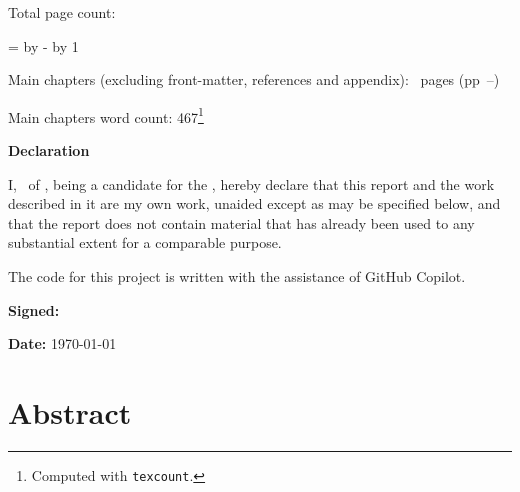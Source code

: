 \begin{sffamily}
\begin{titlepage}
        \makeatother
    \end{titlepage}

    \newpage

    Total page count: \pageref{lastpage}

    \makeatletter
    \@tempcnta=\relax%
    \advance\@tempcnta by -%
    \advance\@tempcnta by 1%
    \xdef\contentpages{\the\@tempcnta}%
    \makeatother

    Main chapters (excluding front-matter, references and appendix):
    \contentpages~pages
    (pp~\pageref{firstcontentpage}--\pageref{lastcontentpage})

    Main chapters word count: 467\footnote{Computed with \texttt{texcount}.}

\end{sffamily}

\vspace{\fill}
\onehalfspacing
\ifsubmission\else\makeatletter
    \textbf{\Huge Declaration}
    \vspace{40pt}

    I, \@author\ of \college, being a candidate for the \course, hereby
    declare that this report and the work described in it are my own work,
    unaided except as may be specified below, and that the report does not
    contain material that has already been used to any substantial extent
    for a comparable purpose.

    The code for this project is written with the assistance of GitHub Copilot.

    \bigskip
    \textbf{Signed:} \@author

    \bigskip
    \textbf{Date:} \today
    \vspace{\fill}
    \makeatother\fi

\chapter*{Abstract}

